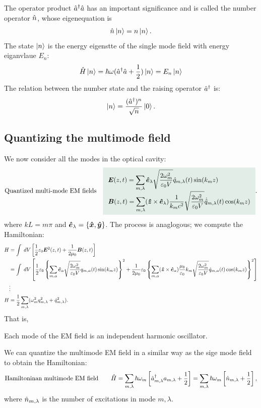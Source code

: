 The operator product $\hat{a}^\dagger\hat{a}$ has an important significance and is called the number operator $\hat{n}$, whose eigenequation is 
\begin{align*}
    \hat{n}\left|n\right\rangle=n\left|n\right\rangle.
\end{align*}
The state $\left|n\right\rangle$ is the energy eigenstte of the single mode field with energy eiganvlaue $E_n$:
\begin{align*}
    \hat{H}\left|n\right\rangle=\hbar\omega(\hat{a}^\dagger\hat{a}+\frac{1}{2})\left|n\right\rangle=E_n\left|n\right\rangle
\end{align*}
The relation between the number state and the raising operator $\hat{a}^\dagger$ is:
\begin{align*}
    \left|n\right\rangle=\frac{(\hat{a}^\dagger)^n}{\sqrt{n}}\left|0\right\rangle.
\end{align*}

\subsection{Quantizing the multimode field}
We now consider all the modes in the optical cavity:
\begin{align}
    \text{Quantized multi-mode EM fields}\quad\highlight{\begin{array}{l}
        \displaystyle\bE(z,t)=\sum_{m,\lambda}\he_\lambda\sqrt{\frac{2\omega_m^2}{\varepsilon_0V}}\hq_{m,\lambda}(t)\sin(k_mz)\\
        \displaystyle\bB(z,t)=\sum_{m,\lambda}(\hz\times\he_\lambda)\frac{1}{k_mc^2}\sqrt{\frac{2\omega_m^2}{\varepsilon_0V}}\dot{\hq}_{m,\lambda}(t)\cos(k_mz)
    \end{array}}.
\end{align}
where $kL=m\pi$ and $\bm{\hat{e}}_\lambda=\{\bm{\hat{x}},\bm{\hat{y}}\}$. The process is anaglogous; we compute the Hamiltonian:
\begin{align*}
    H&=\int\;dV\left[\frac{1}{2}\varepsilon_0\bm{E}^2(z,t)+\frac{1}{2\mu_0}\bm{B}(z,t)\right]\\
    &=\int\;dV\left[\frac{1}{2}\varepsilon_0\left\{\sum_{m,\alpha}\bm{\hat{e}}_\alpha\sqrt{\frac{2\omega_m^2}{\varepsilon_0V}}q_{m,\alpha}(t)\sin(k_mz)\right\}^2
    +\frac{1}{2\mu_0}\varepsilon_0\left\{\sum_{m,\alpha}(\bm{\hat{z}}\times\bm{\hat{e}}_\alpha)\frac{\mu_0}{\varepsilon_0}{k_m}\sqrt{\frac{2\omega_m^2}{\varepsilon_0V}}\dot{q}_{m,\alpha}(t)\cos(k_mz)\right\}^2\right]\\
    &\vdots\\
    H&=\frac{1}{2}\sum_{m,\lambda}(\omega_m^2q_{m,\lambda}^2+\dot{q}_{m,\lambda}^2).
\end{align*}
That is,
\begin{emphasizer}
    Each mode of the EM field is an independent harmonic oscillator.
\end{emphasizer}
We can quantize the multimode EM field in a similar way as the sige mode field to obtain the Hamiltonian:
\begin{align*}
    \text{Hamiltoninan multimode EM field}\qquad\hat{H}=\sum_{m,\lambda}\hbar\omega_{m}\left[\hat{a}^\dagger_{m,\lambda}a_{m,\lambda}+\frac{1}{2}\right]=\sum_{m,\lambda}\hbar\omega_m\left[\hat{n}_{m,\lambda}+\frac{1}{2}\right],
\end{align*}
where $\hat{n}_{m,\lambda}$ is the number of excitations in mode $m,\lambda$.


